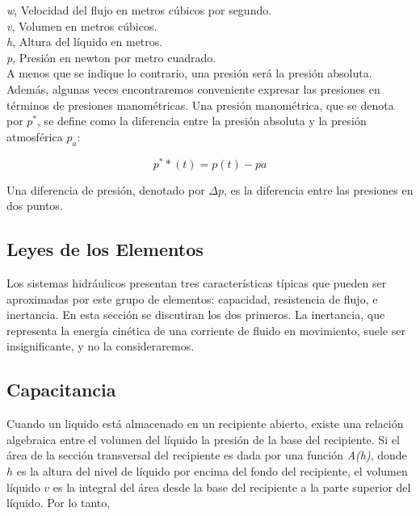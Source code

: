 \documentclass[a4paper,12pt,twoside]{proyectotanquesecci}
\begin{document}
\textit{w}, Velocidad del flujo en metros cúbicos por segundo.\\ 

\textit{v}, Volumen en metros cúbicos.\\ 

\textit{h}, Altura del líquido en metros.\\ 

\textit{p}, Presión en newton por metro cuadrado.\\

A menos que se indique lo contrario, una presión será la presión absoluta. Además,  algunas veces encontraremos conveniente expresar las presiones en términos de presiones manométricas. Una presión manométrica, que se denota por $p^{*}$, se define como la diferencia entre la presión absoluta y la presión atmosférica ${p_{a}}$:

\begin{equation}
p^{*}*(t)=p(t)-pa
\label{Ecu 1}
\end{equation}

Una diferencia de presión, denotado por $\Delta p$, es la diferencia entre las presiones en dos puntos. \\

\subsection{Leyes de los Elementos}

Los sistemas hidráulicos presentan tres características típicas que pueden ser aproximadas por este grupo de elementos: capacidad, resistencia de flujo, e inertancia. En esta sección se discutiran los dos primeros. La inertancia, que representa la energía cinética de una corriente de fluido en movimiento, suele ser insignificante, y no la consideraremos.\\

\subsection{Capacitancia}

Cuando un liquido está almacenado en un recipiente abierto, existe una relación algebraica entre el volumen del líquido la presión de la base del recipiente. Si el área de la sección transversal del recipiente es dada por una función \textit{A(h)}, donde $h$ es la altura del nivel de líquido por encima del fondo del recipiente, el volumen líquido $v$ es la integral del área desde la base del recipiente a la parte superior del líquido. 
Por lo tanto,
\end{document}
